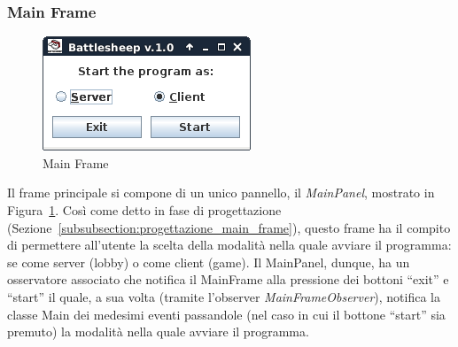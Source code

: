 \subsubsection{Main Frame}
\begin{figure}[!h]
	\centering
	\includegraphics[scale=0.5]{core/imgs/gui/main_frame}
	\caption{Main Frame}
	\label{figure:main_frame}
\end{figure}
Il frame principale si compone di un unico pannello, il \textit{MainPanel},
mostrato in Figura~\ref{figure:main_frame}. Così come detto in fase di
progettazione (Sezione~\ref{subsubsection:progettazione_main_frame}), questo
frame ha il compito di permettere all'utente la scelta della modalità nella
quale avviare il programma: se come server (lobby) o come client (game).\newline
Il MainPanel, dunque, ha un osservatore associato che notifica il MainFrame alla
pressione dei bottoni ``exit'' e ``start'' il quale, a sua volta (tramite
l'observer \textit{MainFrameObserver}), notifica la classe Main dei medesimi
eventi passandole (nel caso in cui il bottone ``start'' sia premuto) la modalità
nella quale avviare il programma.



